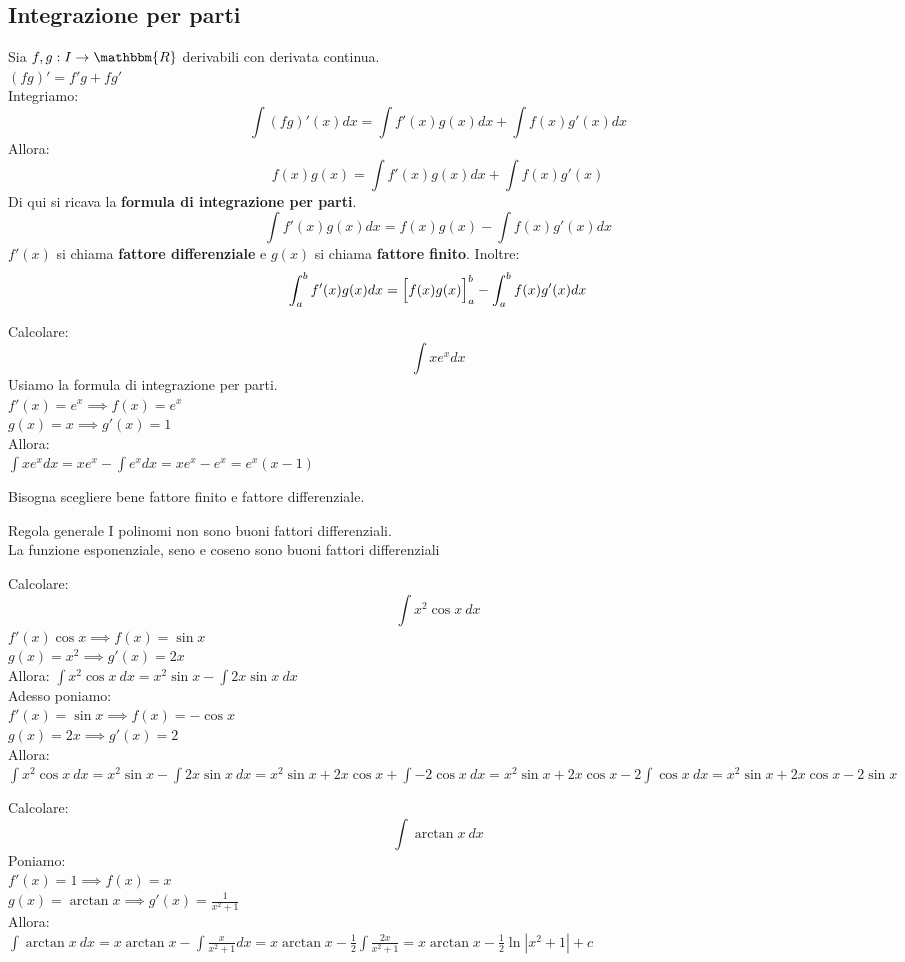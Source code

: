 \documentclass[12pt]{report}
\begin{document}
		\subsection{Integrazione per parti}
		Sia $f, g: I \to \mathbbm{R}$ derivabili con derivata continua. \\
		$(fg)' = f'g + fg'$ \\
		Integriamo:
		\[
		\int (fg)'(x)dx = \int f'(x)g(x)dx + \int f(x)g'(x)dx
		\]
		Allora:
		\[
		f(x)g(x) = \int f'(x)g(x)dx +\int f(x)g'(x)
		\]
		Di qui si ricava la \textbf{formula di integrazione per parti}.
		\[\int f'(x)g(x)dx = f(x)g(x) - \int f(x)g'(x)dx\]
		$f'(x)$ si chiama \textbf{fattore differenziale} e $g(x)$ si chiama \textbf{fattore finito}.
		Inoltre:
		\[
		\int_{a}^{b}f'(x)g(x)dx = \Bigl[f(x)g(x)\Bigr]_{a}^{b} - \int_{a}^{b}f(x)g'(x)dx
		\]
		\begin{example}{}{}
			Calcolare:
			\[
			\int xe^xdx
			\]
			Usiamo la formula di integrazione per parti. \\
			$f'(x)=e^x \implies f(x) = e^x$ \\
			$g(x) = x \implies g'(x) = 1$ \\
			Allora: \\
			$\int xe^xdx = xe^x - \int e^xdx = xe^x - e^x = e^x(x - 1)$
		\end{example}
		Bisogna scegliere bene fattore finito e fattore differenziale.
		\begin{note}{Regola generale}{}
			I polinomi non sono buoni fattori differenziali. \\
			La funzione esponenziale, seno e coseno sono buoni fattori differenziali
		\end{note}
		\begin{example}{}{}
			Calcolare:
			\[
			\int x^2\cos x\ dx
			\]
			$f'(x) \cos x \implies f(x) = \sin x$ \\
			$g(x) = x^2 \implies g'(x) = 2x$ \\
			Allora:
			$\int x^2\cos x\ dx = x^2\sin x - \int 2x\sin x\ dx$ \\
			Adesso poniamo: \\
			$f'(x) = \sin x \implies f(x) = -\cos x$ \\
			$g(x) = 2x \implies g'(x) = 2$ \\
			Allora:
			$\int x^2\cos x\ dx = x^2\sin x - \int 2x\sin x\ dx = x^2\sin x+2x\cos x + \int -2\cos x\ dx =x^2\sin x + 2x\cos x - 2\int\cos x\ dx = x^2\sin x+2x\cos x-2\sin x$
		\end{example}
		\begin{example}{}{}
			Calcolare:
			\[
			\int \arctan x\ dx
			\]
			Poniamo: \\
			$f'(x) = 1 \implies f(x) = x$ \\
			$g(x) = \arctan x \implies g'(x) = \frac{1}{x^2 + 1}$ \\
			Allora: \\
			$\int \arctan x\ dx = x\arctan x - \int \frac{x}{x^2 + 1}dx = x\arctan x - \frac{1}{2}\int \frac{2x}{x^2 + 1} = x\arctan x - \frac{1}{2}\ln |x^2 + 1| + c$
		\end{example}
\end{document}
